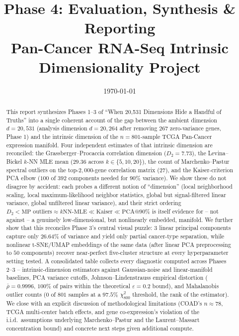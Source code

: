 \documentclass[11pt]{article}
\title{Phase 4: Evaluation, Synthesis \& Reporting \\
\large Pan-Cancer RNA-Seq Intrinsic Dimensionality Project}
\author{}
\date{\today}
\begin{document}
\maketitle

\begin{abstract}
This report synthesizes Phases 1--3 of ``When 20,531 Dimensions Hide a
Handful of Truths'' into a single coherent account of the gap between the
ambient dimension $d = 20{,}531$ (analysis dimension $d = 20{,}264$ after
removing $267$ zero-variance genes, Phase 1) and the intrinsic dimension of
the $n = 801$-sample TCGA Pan-Cancer expression manifold. Four independent
estimates of that intrinsic dimension are reconciled: the Grassberger--Procaccia
correlation dimension ($D_2 = 7.73$), the Levina--Bickel $k$-NN MLE mean
($29.36$ across $k \in \{5,10,20\}$), the count of Marchenko--Pastur spectral
outliers on the top-$2{,}000$-gene correlation matrix ($27$), and the
Kaiser-criterion PCA elbow ($100$ of $392$ components needed for $90\%$
variance). We show these do not disagree by accident: each probes a
different notion of ``dimension'' (local neighborhood scaling, local
maximum-likelihood neighbor statistics, global but signal-filtered linear
variance, global unfiltered linear variance), and their strict ordering
$D_2 < \text{MP outliers} \approx k\text{NN-MLE} \ll \text{Kaiser} \ll
\text{PCA@90\%}$ is itself evidence for -- not against -- a genuinely
low-dimensional, but nonlinearly embedded, manifold. We further show that
this reconciles Phase 3's central visual puzzle: $3$ linear principal
components capture only $26.64\%$ of variance and yield only partial
cancer-type separation, while nonlinear t-SNE/UMAP embeddings of the same
data (after linear PCA preprocessing to $50$ components) recover
near-perfect five-cluster structure at every hyperparameter setting tested.
A consolidated table collects every diagnostic computed across Phases 2--3
-- intrinsic-dimension estimators against Gaussian-noise and linear-manifold
baselines, PCA variance cutoffs, Johnson--Lindenstrauss empirical distortion
($\bar\rho = 0.9996$, $100\%$ of pairs within the theoretical $\varepsilon =
0.2$ bound), and Mahalanobis outlier counts ($0$ of $801$ samples at a
$97.5\%$ $\chi^2_{800}$ threshold, the rank of the estimator). We close with an explicit discussion of
methodological limitations (COAD's $n \approx 78$, TCGA multi-center batch
effects, and gene co-expression's violation of the i.i.d.\ assumptions
underlying Marchenko--Pastur and the Laurent--Massart concentration bound)
and concrete next steps given additional compute.
\end{abstract}
\end{document}
